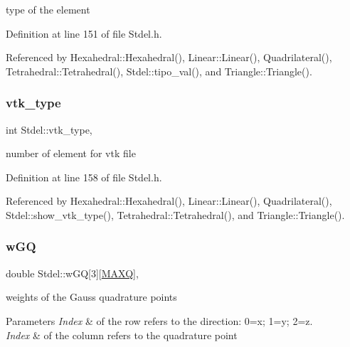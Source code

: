 type of the element 



Definition at line 151 of file Stdel.\+h.



Referenced by Hexahedral\+::\+Hexahedral(), Linear\+::\+Linear(), Quadrilateral(), Tetrahedral\+::\+Tetrahedral(), Stdel\+::tipo\+\_\+val(), and Triangle\+::\+Triangle().

\mbox{\label{classStdel_a55624584790a08437c03540489d04898}} 
\subsubsection{\texorpdfstring{vtk\+\_\+type}{vtk\_type}}
{\footnotesize\ttfamily int Stdel\+::vtk\+\_\+type\hspace{0.3cm}{\ttfamily [protected]}, {\ttfamily [inherited]}}



number of element for vtk file 



Definition at line 158 of file Stdel.\+h.



Referenced by Hexahedral\+::\+Hexahedral(), Linear\+::\+Linear(), Quadrilateral(), Stdel\+::show\+\_\+vtk\+\_\+type(), Tetrahedral\+::\+Tetrahedral(), and Triangle\+::\+Triangle().

\mbox{\label{classStdel_af99d72cbda49c30e23e83705c95a1c5b}} 
\subsubsection{\texorpdfstring{w\+GQ}{wGQ}}
{\footnotesize\ttfamily double Stdel\+::w\+GQ\mbox{[}3\mbox{]}\mbox{[}\hyperlink{MyOptions_8h_af708e94d886ba3f59582612949cac702}{M\+A\+XQ}\mbox{]}\hspace{0.3cm}{\ttfamily [protected]}, {\ttfamily [inherited]}}

weights of the Gauss quadrature points 
\begin{DoxyParams}{Parameters}
{\em Index} & of the row refers to the direction\+: 0=x; 1=y; 2=z. \\
\hline
{\em Index} & of the column refers to the quadrature point \\
\hline
\end{DoxyParams}


